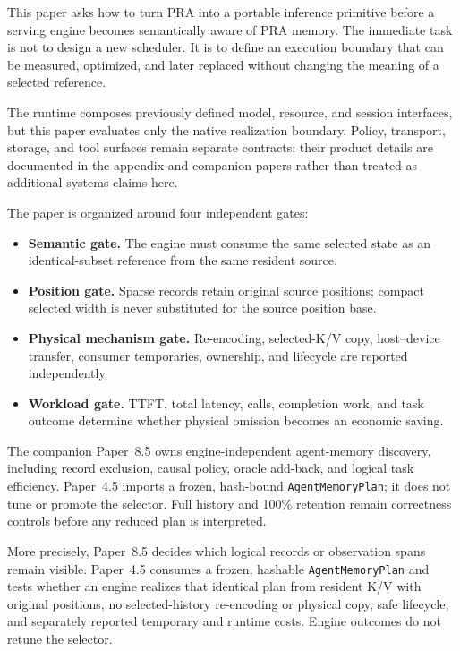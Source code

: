 \documentclass[11pt]{article}
\begin{document}
This paper asks how to turn PRA into a portable inference primitive before a
serving engine becomes semantically aware of PRA memory.  The immediate task is
not to design a new scheduler.  It is to define an execution boundary that can
be measured, optimized, and later replaced without changing the meaning of a
selected reference.

The runtime composes previously defined model, resource, and session
interfaces, but this paper evaluates only the native realization boundary.
Policy, transport, storage, and tool surfaces remain separate contracts; their
product details are documented in the appendix and companion papers rather
than treated as additional systems claims here.

The paper is organized around four independent gates:

\begin{itemize}[leftmargin=*]
\item \textbf{Semantic gate.} The engine must consume the same selected state
as an identical-subset reference from the same resident source.
\item \textbf{Position gate.} Sparse records retain original source positions;
compact selected width is never substituted for the source position base.
\item \textbf{Physical mechanism gate.} Re-encoding, selected-K/V copy,
host--device transfer, consumer temporaries, ownership, and lifecycle are
reported independently.
\item \textbf{Workload gate.} TTFT, total latency, calls, completion work, and
task outcome determine whether physical omission becomes an economic saving.
\end{itemize}

The companion Paper~8.5 owns engine-independent agent-memory discovery,
including record exclusion, causal policy, oracle add-back, and logical task
efficiency.  Paper~4.5 imports a frozen, hash-bound \texttt{AgentMemoryPlan}; it
does not tune or promote the selector.  Full history and 100\% retention remain
correctness controls before any reduced plan is interpreted.

More precisely, Paper~8.5 decides which logical records or observation spans
remain visible.  Paper~4.5 consumes a frozen, hashable
\texttt{AgentMemoryPlan} and tests whether an engine realizes that identical
plan from resident K/V with original positions, no selected-history
re-encoding or physical copy, safe lifecycle, and separately reported
temporary and runtime costs.  Engine outcomes do not retune the selector.
\end{document}
